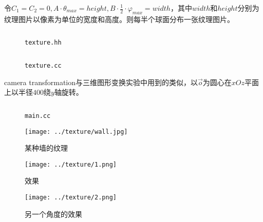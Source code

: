 \documentclass{cumtbrep}
\newcommand\inputcode[3][c++]{%
	\inputminted{#1}{#2}
	\begin{figure}[H]
		\centering
		\captionsetup{type=table}
		\caption{\texttt{#3}}
	\end{figure}
}
\begin{document}
令$C_1=C_2=0,A\cdot\theta_{\mathit{max}}=\mathit{height},B\cdot\frac{1}{2}\cdot\varphi_{\mathit{max}}=\mathit{width}$，其中$\mathit{width}$和$\mathit{height}$分别为纹理图片以像素为单位的宽度和高度。则每半个球面分布一张纹理图片。
\inputcode{../texture/texture.hh}{texture.hh}
\inputcode{../texture/texture.cc}{texture.cc}

camera transformation与三维图形变换实验中用到的类似，以$\vec o$为圆心在$xOz$平面上以半径$400$绕$y$轴旋转。
\inputcode{../texture/main.cc}{main.cc}

\analysesec
\begin{figure}\label{fig:wall}
	\centering
	\texttt{[image: ../texture/wall.jpg]}
	\caption{某种墙的纹理}
\end{figure}
\begin{figure}
	\centering
	\texttt{[image: ../texture/1.png]}
	\caption{效果}
\end{figure}
\begin{figure}
	\centering
	\texttt{[image: ../texture/2.png]}
	\caption{另一个角度的效果}
\end{figure}

\maketail
\end{document}
